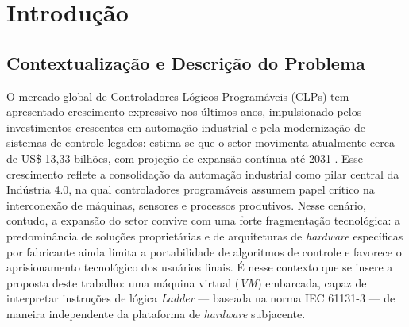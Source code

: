 \chapter{Introdução}
\label{cap:introducao}

\section{Contextualização e Descrição do Problema}
\label{sec:contextualizacao}

O mercado global de Controladores Lógicos Programáveis (CLPs) tem apresentado crescimento expressivo nos últimos anos, impulsionado pelos investimentos crescentes em automação industrial e pela modernização de sistemas de controle legados: estima-se que o setor movimenta atualmente cerca de US\$ 13,33 bilhões, com projeção de expansão contínua até 2031 \cite{mordor:2026}.
Esse crescimento reflete a consolidação da automação industrial como pilar central da Indústria 4.0, na qual controladores programáveis assumem papel crítico na interconexão de máquinas, sensores e processos produtivos.
Nesse cenário, contudo, a expansão do setor convive com uma forte fragmentação tecnológica: a predominância de soluções proprietárias e de arquiteturas de \textit{hardware} específicas por fabricante ainda limita a portabilidade de algoritmos de controle e favorece o aprisionamento tecnológico dos usuários finais.
É nesse contexto que se insere a proposta deste trabalho: uma máquina virtual (\textit{VM}) embarcada, capaz de interpretar instruções de lógica \textit{Ladder} --- baseada na norma IEC 61131-3 \cite{iec:2025} --- de maneira independente da plataforma de \textit{hardware} subjacente.

